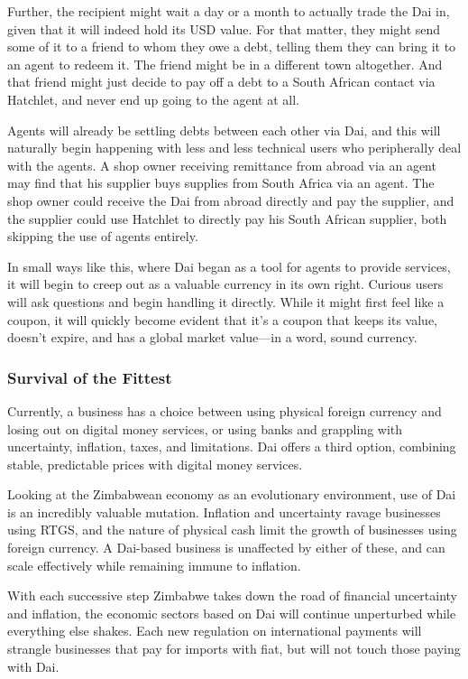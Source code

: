 \documentclass{article}
\begin{document}
Further, the recipient might wait a day or a month to actually trade the Dai in, given that it will indeed hold its USD value. For that matter, they might send some of it to a friend to whom they owe a debt, telling them they can bring it to an agent to redeem it. The friend might be in a different town altogether. And that friend might just decide to pay off a debt to a South African contact via Hatchlet, and never end up going to the agent at all.

Agents will already be settling debts between each other via Dai, and this will naturally begin happening with less and less technical users who peripherally deal with the agents. A shop owner receiving remittance from abroad via an agent may find that his supplier buys supplies from South Africa via an agent. The shop owner could receive the Dai from abroad directly and pay the supplier, and the supplier could use Hatchlet to directly pay his South African supplier, both skipping the use of agents entirely.

In small ways like this, where Dai began as a tool for agents to provide services, it will begin to creep out as a valuable currency in its own right. Curious users will ask questions and begin handling it directly. While it might first feel like a coupon, it will quickly become evident that it's a coupon that keeps its value, doesn't expire, and has a global market value---in a word, sound currency.

\subsubsection{Survival of the Fittest} \label{fittest}

Currently, a business has a choice between using physical foreign currency and losing out on digital money services, or using banks and grappling with uncertainty, inflation, taxes, and limitations. Dai offers a third option, combining stable, predictable prices with digital money services.

Looking at the Zimbabwean economy as an evolutionary environment, use of Dai is an incredibly valuable mutation. Inflation and uncertainty ravage businesses using RTGS, and the nature of physical cash limit the growth of businesses using foreign currency. A Dai-based business is unaffected by either of these, and can scale effectively while remaining immune to inflation.

With each successive step Zimbabwe takes down the road of financial uncertainty and inflation, the economic sectors based on Dai will continue unperturbed while everything else shakes. Each new regulation on international payments will strangle businesses that pay for imports with fiat, but will not touch those paying with Dai.
\end{document}
